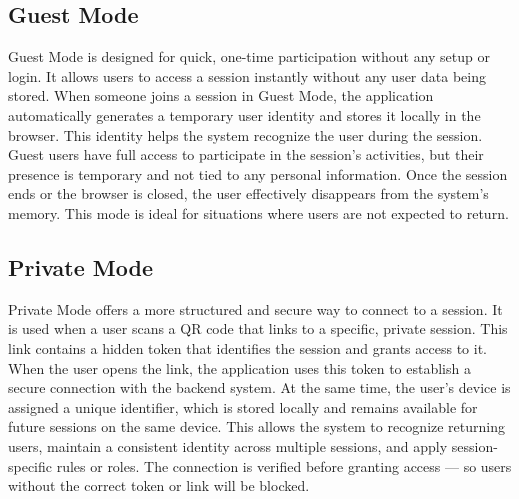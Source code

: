 \subsection{Guest Mode}
Guest Mode is designed for quick, one-time participation without any setup or login. 
It allows users to access a session instantly without any user data being stored. 
When someone joins a session in Guest Mode, the application automatically generates a temporary user identity and stores it locally in the browser. 
This identity helps the system recognize the user during the session. 
Guest users have full access to participate in the session’s activities, but their presence is temporary and not tied to any personal information. 
Once the session ends or the browser is closed, the user effectively disappears from the system’s memory.
This mode is ideal for situations where users are not expected to return.

\subsection{Private Mode}
Private Mode offers a more structured and secure way to connect to a session. 
It is used when a user scans a QR code that links to a specific, private session. 
This link contains a hidden token that identifies the session and grants access to it. 
When the user opens the link, the application uses this token to establish a secure connection with the backend system. 
At the same time, the user's device is assigned a unique identifier, which is stored locally and remains available for future sessions on the same device. 
This allows the system to recognize returning users, maintain a consistent identity across multiple sessions, and apply session-specific rules or roles. 
The connection is verified before granting access — so users without the correct token or link will be blocked.